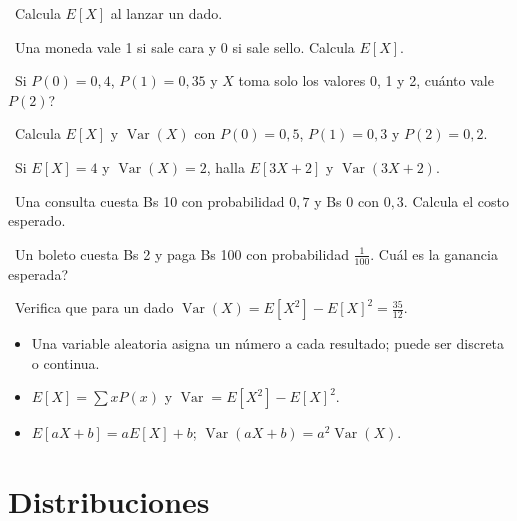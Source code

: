 \begin{tmejercicios}
\label{ej:5-2}
\begin{tmlista}
\item \tmbasico\ Calcula $E[X]$ al lanzar un dado.
\item \tmbasico\ Una moneda vale 1 si sale cara y 0 si sale sello. Calcula $E[X]$.
\item \tmbasico\ Si $P(0)=0{,}4$, $P(1)=0{,}35$ y $X$ toma solo los valores 0, 1 y 2, \textquestiondown cu\'anto vale $P(2)$?
\item \tmmedio\ Calcula $E[X]$ y $\operatorname{Var}(X)$ con $P(0)=0{,}5$, $P(1)=0{,}3$ y $P(2)=0{,}2$.
\item \tmmedio\ Si $E[X]=4$ y $\operatorname{Var}(X)=2$, halla $E[3X+2]$ y $\operatorname{Var}(3X+2)$.
\item \tmmedio\ Una consulta cuesta Bs 10 con probabilidad $0{,}7$ y Bs 0 con $0{,}3$. Calcula el costo esperado.
\item \tmdificil\ Un boleto cuesta Bs 2 y paga Bs 100 con probabilidad $\frac1{100}$. \textquestiondown Cu\'al es la ganancia esperada?
\item \tmdificil\ Verifica que para un dado $\operatorname{Var}(X)=E[X^2]-E[X]^2=\frac{35}{12}$.
\end{tmlista}
\end{tmejercicios}


\begin{tmresumen}
\begin{itemize}
\item Una variable aleatoria asigna un n\'umero a cada resultado; puede ser discreta o continua.
\item $E[X]=\sum xP(x)$ y $\operatorname{Var}=E[X^2]-E[X]^2$.
\item $E[aX+b]=aE[X]+b$; $\operatorname{Var}(aX+b)=a^2\operatorname{Var}(X)$.
\end{itemize}
\end{tmresumen}

\section{Distribuciones}
\label{sec:5-3}


